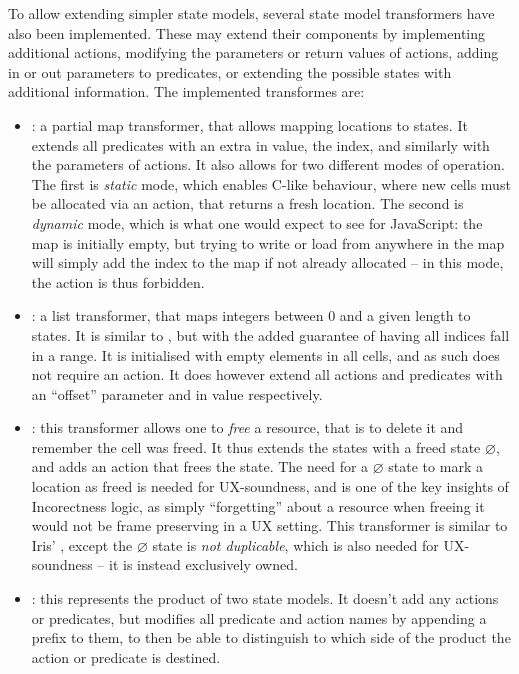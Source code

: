 To allow extending simpler state models, several state model transformers have also been implemented. These may extend their components by implementing additional actions, modifying the parameters or return values of actions, adding in or out parameters to predicates, or extending the possible states with additional information. The implemented transformes are: \begin{itemize}
	\item {}: a partial map transformer, that allows mapping locations to states. It extends all predicates with an extra in value, the index, and similarly with the parameters of actions. It also allows for two different modes of operation. The first is \emph{static} mode, which enables C-like behaviour, where new cells must be allocated via an  action, that returns a fresh location. The second is \emph{dynamic} mode, which is what one would expect to see for JavaScript: the map is initially empty, but trying to write or load from anywhere in the map will simply add the index to the map if not already allocated -- in this mode, the  action is thus forbidden.
	\item {}: a list transformer, that maps integers between $0$ and a given length to states. It is similar to , but with the added guarantee of having all indices fall in a range. It is initialised with empty elements in all cells, and as such does not require an  action. It does however extend all actions and predicates with an ``offset'' parameter and in value respectively.
	\item {}: this transformer allows one to \emph{free} a resource, that is to delete it and remember the cell was freed. It thus extends the states with a freed state $\varnothing$, and adds an action  that frees the state. The need for a $\varnothing$ state to mark a location as freed is needed for UX-soundness, and is one of the key insights of Incorectness logic\cite{incorrectnesslogic}, as simply ``forgetting'' about a resource when freeing it would not be frame preserving in a UX setting. This transformer is similar to Iris' , except the $\varnothing$ state is \emph{not duplicable}, which is also needed for UX-soundness -- it is instead exclusively owned.
	\item {}: this represents the product of two state models. It doesn't add any actions or predicates, but modifies all predicate and action names by appending a prefix to them, to then be able to distinguish to which side of the product the action or predicate is destined.
\end{itemize}

